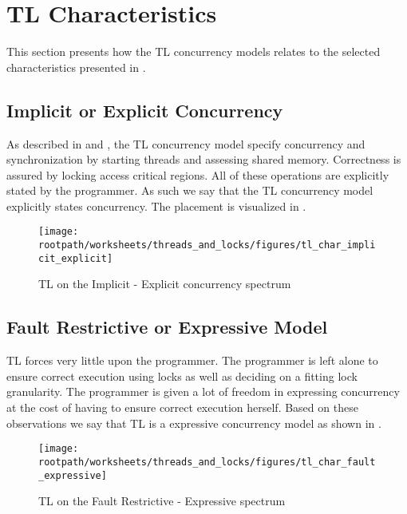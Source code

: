 
\section{\acl{TL} Characteristics}
This section presents how the \ac{TL} concurrency models relates to the selected characteristics presented in .

\subsection{Implicit or Explicit Concurrency}
As described in  and , the \ac{TL} concurrency model specify concurrency and synchronization by starting threads and assessing shared memory. Correctness is assured by locking access critical regions. All of these operations are explicitly stated by the programmer. As such we say that the \ac{TL} concurrency model explicitly states concurrency. The placement is visualized in .

\begin{figure}[htbp]
\centering
 \texttt{[image: \\rootpath/worksheets/threads\_and\_locks/figures/tl\_char\_implicit\_explicit]} 
 \caption{\ac{TL} on the Implicit - Explicit concurrency spectrum}
\label{fig:char_implicit_explicit}
\end{figure}

\subsection{Fault Restrictive or Expressive Model}
\ac{TL} forces very little upon the programmer. The programmer is left alone to ensure correct execution using locks as well as deciding on a fitting lock granularity. The programmer is given a lot of freedom in expressing concurrency at the cost of having to ensure correct execution herself. Based on these observations we say that \ac{TL} is a expressive concurrency model as shown in .

\begin{figure}[htbp]
\centering
 \texttt{[image: \\rootpath/worksheets/threads\_and\_locks/figures/tl\_char\_fault\_expressive]} 
 \caption{\ac{TL} on the Fault Restrictive - Expressive spectrum}
\label{fig:char_fault_expressive}
\end{figure}

